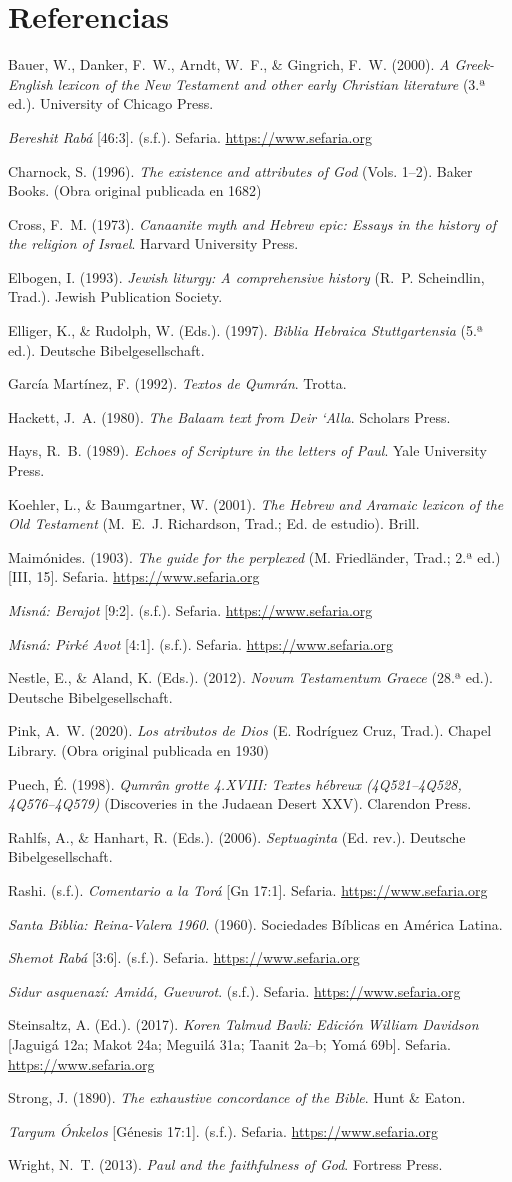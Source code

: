 \documentclass[11pt,letterpaper]{article}
\newcommand{\refapa}[1]{\par{\RaggedRight\hangindent=1.27cm\hangafter=1\noindent #1\par}\vspace{4pt}}
\begin{document}
\section*{Referencias}

\refapa{Bauer, W., Danker, F.~W., Arndt, W.~F., \& Gingrich, F.~W. (2000). \emph{A Greek-English lexicon of the New Testament and other early Christian literature} (3.ª ed.). University of Chicago Press.}
\refapa{\emph{Bereshit Rabá} [46:3]. (s.f.). Sefaria. \url{https://www.sefaria.org}}
\refapa{Charnock, S. (1996). \emph{The existence and attributes of God} (Vols. 1--2). Baker Books. (Obra original publicada en 1682)}
\refapa{Cross, F.~M. (1973). \emph{Canaanite myth and Hebrew epic: Essays in the history of the religion of Israel}. Harvard University Press.}
\refapa{Elbogen, I. (1993). \emph{Jewish liturgy: A comprehensive history} (R.~P. Scheindlin, Trad.). Jewish Publication Society.}
\refapa{Elliger, K., \& Rudolph, W. (Eds.). (1997). \emph{Biblia Hebraica Stuttgartensia} (5.ª ed.). Deutsche Bibelgesellschaft.}
\refapa{García Martínez, F. (1992). \emph{Textos de Qumrán}. Trotta.}
\refapa{Hackett, J.~A. (1980). \emph{The Balaam text from Deir `Alla}. Scholars Press.}
\refapa{Hays, R.~B. (1989). \emph{Echoes of Scripture in the letters of Paul}. Yale University Press.}
\refapa{Koehler, L., \& Baumgartner, W. (2001). \emph{The Hebrew and Aramaic lexicon of the Old Testament} (M.~E.~J. Richardson, Trad.; Ed. de estudio). Brill.}
\refapa{Maimónides. (1903). \emph{The guide for the perplexed} (M. Friedländer, Trad.; 2.ª ed.) [III, 15]. Sefaria. \url{https://www.sefaria.org}}
\refapa{\emph{Misná: Berajot} [9:2]. (s.f.). Sefaria. \url{https://www.sefaria.org}}
\refapa{\emph{Misná: Pirké Avot} [4:1]. (s.f.). Sefaria. \url{https://www.sefaria.org}}
\refapa{Nestle, E., \& Aland, K. (Eds.). (2012). \emph{Novum Testamentum Graece} (28.ª ed.). Deutsche Bibelgesellschaft.}
\refapa{Pink, A.~W. (2020). \emph{Los atributos de Dios} (E. Rodríguez Cruz, Trad.). Chapel Library. (Obra original publicada en 1930)}
\refapa{Puech, É. (1998). \emph{Qumrân grotte 4.XVIII: Textes hébreux (4Q521--4Q528, 4Q576--4Q579)} (Discoveries in the Judaean Desert XXV). Clarendon Press.}
\refapa{Rahlfs, A., \& Hanhart, R. (Eds.). (2006). \emph{Septuaginta} (Ed. rev.). Deutsche Bibelgesellschaft.}
\refapa{Rashi. (s.f.). \emph{Comentario a la Torá} [Gn 17:1]. Sefaria. \url{https://www.sefaria.org}}
\refapa{\emph{Santa Biblia: Reina-Valera 1960}. (1960). Sociedades Bíblicas en América Latina.}
\refapa{\emph{Shemot Rabá} [3:6]. (s.f.). Sefaria. \url{https://www.sefaria.org}}
\refapa{\emph{Sidur asquenazí: Amidá, Guevurot}. (s.f.). Sefaria. \url{https://www.sefaria.org}}
\refapa{Steinsaltz, A. (Ed.). (2017). \emph{Koren Talmud Bavli: Edición William Davidson} [Jaguigá 12a; Makot 24a; Meguilá 31a; Taanit 2a--b; Yomá 69b]. Sefaria. \url{https://www.sefaria.org}}
\refapa{Strong, J. (1890). \emph{The exhaustive concordance of the Bible}. Hunt \& Eaton.}
\refapa{\emph{Targum Ónkelos} [Génesis 17:1]. (s.f.). Sefaria. \url{https://www.sefaria.org}}
\refapa{Wright, N.~T. (2013). \emph{Paul and the faithfulness of God}. Fortress Press.}
\end{document}
